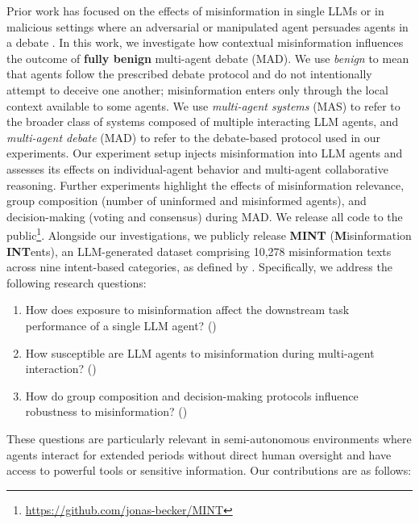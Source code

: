 \documentclass[11pt]{article}
\begin{document}
Prior work has focused on the effects of misinformation in single LLMs \citep{peng-etal-2025-misinformation} or in malicious settings where an adversarial or manipulated agent persuades agents in a debate \citep{AmayuelasYAH24, JuWMC24}.
In this work, we investigate how contextual misinformation influences the outcome of \textbf{fully benign} multi-agent debate (MAD). 
We use \textit{benign} to mean that agents follow the prescribed debate protocol and do not intentionally attempt to deceive one another; misinformation enters only through the local context available to some agents. 
We use \textit{multi-agent systems} (MAS) to refer to the broader class of systems composed of multiple interacting LLM agents, and \textit{multi-agent debate} (MAD) to refer to the debate-based protocol used in our experiments. 
Our experiment setup injects misinformation into LLM agents and assesses its effects on individual-agent behavior and multi-agent collaborative reasoning. 
Further experiments highlight the effects of misinformation relevance, group composition (number of uninformed and misinformed agents), and decision-making (voting and consensus) during MAD.
We release all code to the public\footnote{\url{https://github.com/jonas-becker/MINT}}.
Alongside our investigations, we publicly release \textbf{MINT} (\textbf{M}isinformation \textbf{INT}ents), an LLM-generated dataset comprising 10,278 misinformation texts across nine intent-based categories, as defined by \citet{AimeurAB23}. 
Specifically, we address the following research questions:
\begin{enumerate}[label=RQ\arabic*]
    \setlength{\itemsep}{4pt}
    \setlength{\parskip}{0pt}
    \setlength{\parsep}{0pt}
    \item How does exposure to misinformation affect the downstream task performance of a single LLM agent? ()
    \item How susceptible are LLM agents to misinformation during multi-agent interaction? ()
    \item How do group composition and decision-making protocols influence robustness to misinformation? ()
\end{enumerate}
These questions are particularly relevant in semi-autonomous environments where agents interact for extended periods without direct human oversight and have access to powerful tools or sensitive information.
Our contributions are as follows:
\end{document}
